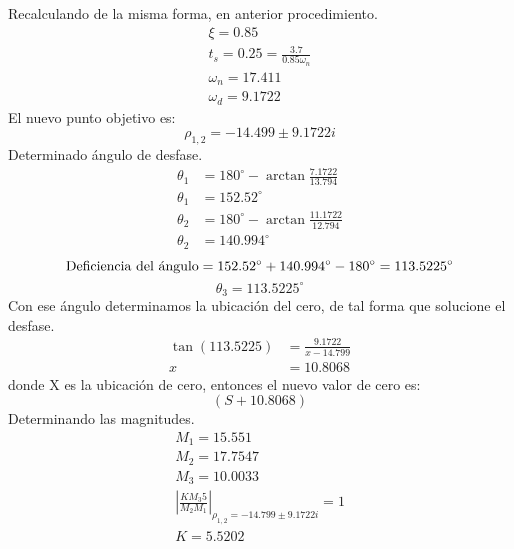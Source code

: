 \documentclass[10pt, a4paper]{report}
\begin{document}
Recalculando de la misma forma, en anterior procedimiento.
\begin{equation*}
  \begin{split}
    \xi = 0.85\\
    t_s = 0.25 = \frac{3.7}{0.85 \omega_n}\\
    \omega_n = 17.411\\
    \omega_d = 9.1722
  \end{split}
\end{equation*}
El nuevo punto objetivo es:
\begin{equation*}
  \rho_{1,2}= -14.499 \pm 9.1722i
\end{equation*}
Determinado ángulo de desfase.
\begin{equation*}
  \begin{split}
    \theta_1 &= 180^{\circ} - \arctan \frac{7.1722}{13.794}\\
    \theta_1 &= 152.52^{\circ}\\
    \theta_2 &= 180^{\circ} - \arctan \frac{11.1722}{12.794}\\
    \theta_2 &= 140.994^{\circ}
  \end{split}
\end{equation*}
\begin{equation*}
    \textup{Deficiencia del ángulo}= 152.52^{\circ} + 140.994^{\circ} - 180^{\circ} = 113.5225^{\circ}
 \end{equation*}
 \begin{equation*}
     \theta_3 = 113.5225^{\circ}
  \end{equation*}
  Con ese ángulo determinamos la ubicación del cero, de tal forma que solucione el desfase.
  \begin{equation*}
   \begin{split}
   \tan (113.5225)&= \frac{9.1722}{x -14.799}\\
   x &= 10.8068
   \end{split}
  \end{equation*}
  donde X es la ubicación de cero, entonces el nuevo valor de cero es:
  \begin{equation*}
    (S+10.8068)
  \end{equation*}
  Determinando las magnitudes.
  \begin{equation*}
    \begin{split}
    M_1 = 15.551\\
    M_2 = 17.7547\\
    M_3 = 10.0033\\
    \left\lvert \frac{K M_3 5 }{M_2 M_1}\right\rvert_{\rho_{1,2}=-14.799\pm 9.1722i} = 1 \\
    K=5.5202
    \end{split}
  \end{equation*}
\end{document}
